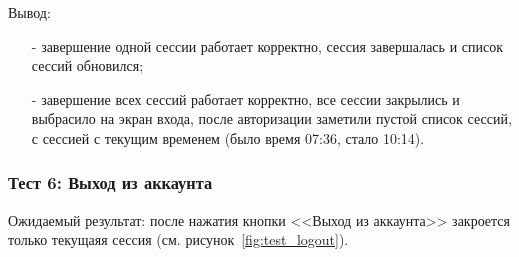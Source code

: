 Вывод:
\begin{itemize}
    \item[-] завершение одной сессии работает корректно, сессия завершалась и список сессий обновился;
    \item[-] завершение всех сессий работает корректно, все сессии закрылись и выбрасило на экран входа,
    после авторизации заметили пустой список сессий, с сессией с текущим временем (было время 07:36, стало 10:14).
\end{itemize}

\subsubsection*{Тест 6: Выход из аккаунта}

Ожидаемый результат: после нажатия кнопки <<Выход из аккаунта>> закроется только текущаяя сессия (см. рисунок~\ref{fig:test_logout}).

